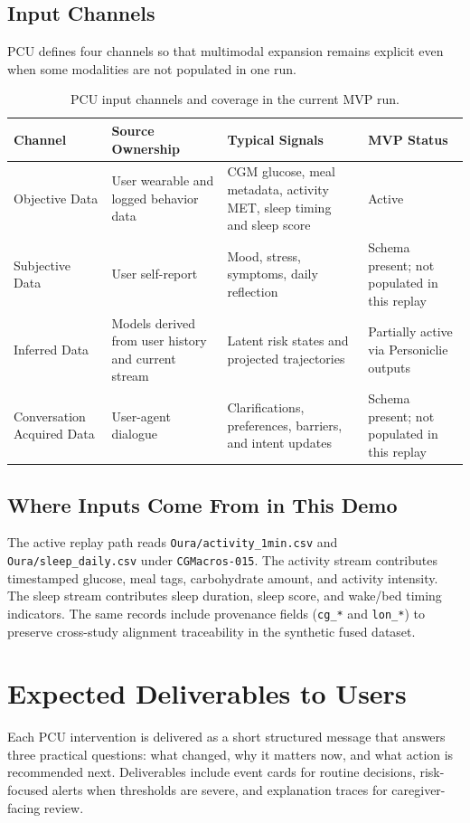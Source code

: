 \documentclass[11pt]{article}
\begin{document}
\subsection{Input Channels}
PCU defines four channels so that multimodal expansion remains explicit even when some modalities are not populated in one run.

\begin{table}[h]
\centering
\begin{tabularx}{\textwidth}{>{\raggedright\arraybackslash}p{} >{\raggedright\arraybackslash}p{} >{\raggedright\arraybackslash}X >{\raggedright\arraybackslash}p{}}
\toprule
Channel & Source Ownership & Typical Signals & MVP Status \\
\midrule
Objective Data & User wearable and logged behavior data & CGM glucose, meal metadata, activity MET, sleep timing and sleep score & Active \\
Subjective Data & User self-report & Mood, stress, symptoms, daily reflection & Schema present; not populated in this replay \\
Inferred Data & Models derived from user history and current stream & Latent risk states and projected trajectories & Partially active via Personiclie outputs \\
Conversation Acquired Data & User-agent dialogue & Clarifications, preferences, barriers, and intent updates & Schema present; not populated in this replay \\
\bottomrule
\end{tabularx}
\caption{PCU input channels and coverage in the current MVP run.}
\label{tab:inputs}
\end{table}

\subsection{Where Inputs Come From in This Demo}
The active replay path reads \texttt{Oura/activity\_1min.csv} and \texttt{Oura/sleep\_daily.csv} under \texttt{CGMacros-015}. The activity stream contributes timestamped glucose, meal tags, carbohydrate amount, and activity intensity. The sleep stream contributes sleep duration, sleep score, and wake/bed timing indicators. The same records include provenance fields (\texttt{cg\_*} and \texttt{lon\_*}) to preserve cross-study alignment traceability in the synthetic fused dataset.

\section{Expected Deliverables to Users}
Each PCU intervention is delivered as a short structured message that answers three practical questions: what changed, why it matters now, and what action is recommended next. Deliverables include event cards for routine decisions, risk-focused alerts when thresholds are severe, and explanation traces for caregiver-facing review.
\end{document}
